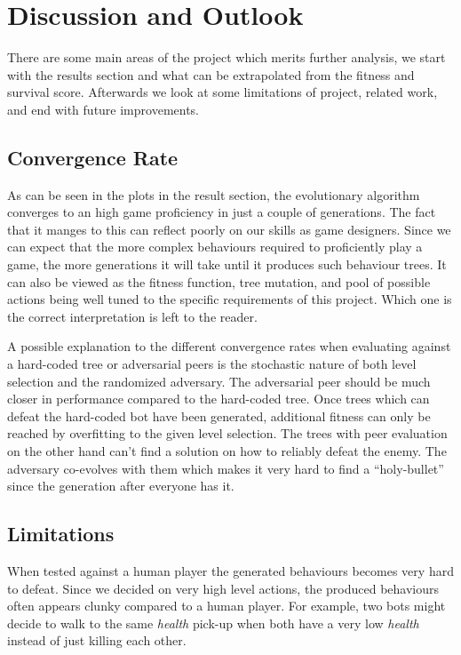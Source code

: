 \documentclass[a4paper, twocolumn]{article}
\begin{document}
    \section{Discussion and Outlook} \label{sec:discussion_and_outlook}

    There are some main areas of the project which merits further analysis, we start with the results section and what can be extrapolated from the fitness and survival score. Afterwards we look at some limitations of project, related work, and end with future improvements.

    \subsection*{Convergence Rate}

    As can be seen in the plots in the result section, the evolutionary algorithm converges to an high game proficiency in just a couple of generations. The fact that it manges to this can reflect poorly on our skills as game designers. Since we can expect that the more complex behaviours required to proficiently play a game, the more generations it will take until it produces such behaviour trees. It can also be viewed as the fitness function, tree mutation, and pool of possible actions being well tuned to the specific requirements of this project. Which one is the correct interpretation is left to the reader. 

    A possible explanation to the different convergence rates when evaluating against a hard-coded tree or adversarial peers is the stochastic nature of both level selection and the randomized adversary. The adversarial peer should be much closer in performance compared to the hard-coded tree. Once trees which can defeat the hard-coded bot have been generated, additional fitness can only be reached by overfitting to the given level selection. The trees with peer evaluation on the other hand can't find a solution on how to reliably defeat the enemy. The adversary co-evolves with them which makes it very hard to find a ``holy-bullet'' since the generation after everyone has it.

    \subsection*{Limitations}

    When tested against a human player the generated behaviours becomes very hard to defeat. Since we decided on very high level actions, the produced behaviours often appears clunky compared to a human player. For example, two bots might decide to walk to the same \emph{health} pick-up when both have a very low \emph{health} instead of just killing each other. 
\end{document}
